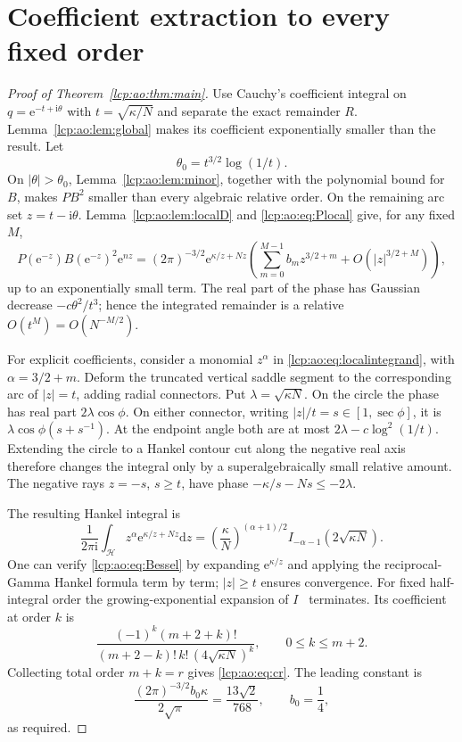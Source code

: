 \documentclass[11pt]{article}
\numberwithin{equation}{section}
\theoremstyle{definition}\newtheorem{definition}[theorem]{Definition}
\theoremstyle{remark}\newtheorem{remark}[theorem]{Remark}
\newcommand{\ee}{\mathrm e}
\newcommand{\ii}{\mathrm i}%
\newcommand{\dd}{\mathrm d}%
\begin{document}
\section{Coefficient extraction to every fixed order}\label{lcp:ao:sec:extraction}
\begin{proof}[Proof of Theorem~\ref{lcp:ao:thm:main}]
Use Cauchy's coefficient integral on $q=\ee^{-t+\ii\theta}$ with
$t=\sqrt{\kappa/N}$ and separate the exact remainder $R$. Lemma~\ref{lcp:ao:lem:global} makes its coefficient exponentially smaller than the result. Let
\[
\theta_0=t^{3/2}\log(1/t).
\]
On $|\theta|>\theta_0$, Lemma~\ref{lcp:ao:lem:minor}, together with the polynomial bound for $B$, makes $PB^2$ smaller than every algebraic relative order. On the remaining arc set $z=t-\ii\theta$. Lemma~\ref{lcp:ao:lem:localD} and \eqref{lcp:ao:eq:Plocal} give, for any fixed $M$,
\begin{equation}\label{lcp:ao:eq:localintegrand}
 P(\ee^{-z})B(\ee^{-z})^2\ee^{nz}
 =(2\pi)^{-3/2}\ee^{\kappa/z+Nz}
 \left(\sum_{m=0}^{M-1}b_mz^{3/2+m}+O(|z|^{3/2+M})\right),
\end{equation}
up to an exponentially small term. The real part of the phase has Gaussian decrease $-c\theta^2/t^3$; hence the integrated remainder is a relative $O(t^M)=O(N^{-M/2})$.

For explicit coefficients, consider a monomial $z^\alpha$ in \eqref{lcp:ao:eq:localintegrand}, with $\alpha=3/2+m$. Deform the truncated vertical saddle segment to the corresponding arc of $|z|=t$, adding radial connectors. Put $\lambda=\sqrt{\kappa N}$. On the circle the phase has real part $2\lambda\cos\phi$. On either connector, writing $|z|/t=s\in[1,\sec\phi]$, it is $\lambda\cos\phi(s+s^{-1})$. At the endpoint angle both are at most $2\lambda-c\log^2(1/t)$. Extending the circle to a Hankel contour cut along the negative real axis therefore changes the integral only by a superalgebraically small relative amount. The negative rays $z=-s$, $s\ge t$, have phase $-\kappa/s-Ns\le-2\lambda$.

The resulting Hankel integral is
\begin{equation}\label{lcp:ao:eq:Bessel}
\frac1{2\pi\ii}\int_{\mathcal H}z^\alpha\ee^{\kappa/z+Nz}\dd z
=\left(\frac\kappa N\right)^{(\alpha+1)/2}
 I_{-\alpha-1}(2\sqrt{\kappa N}).
\end{equation}
One can verify \eqref{lcp:ao:eq:Bessel} by expanding $\ee^{\kappa/z}$ and applying the reciprocal-Gamma Hankel formula term by term; $|z|\ge t$ ensures convergence. For fixed half-integral order the growing-exponential expansion of $I$~\cite[10.40.1]{lcp-ao-dlmf} terminates. Its coefficient at order $k$ is
\[
\frac{(-1)^k(m+2+k)!}{(m+2-k)!\,k!\,(4\sqrt{\kappa N})^k},
\qquad 0\le k\le m+2.
\]
Collecting total order $m+k=r$ gives \eqref{lcp:ao:eq:cr}. The leading constant is
\[
\frac{(2\pi)^{-3/2}b_0\kappa}{2\sqrt\pi}
=\frac{13\sqrt2}{768},\qquad b_0=\frac14,
\]
as required.
\end{proof}
\end{document}
